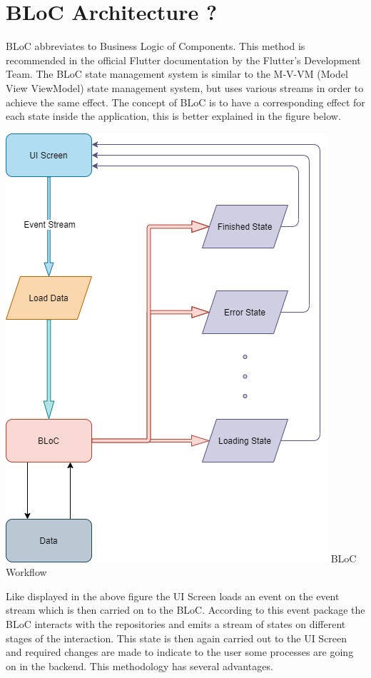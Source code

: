 \documentclass[conference]{IEEEtran}
\newenvironment{Figure}
  {\par\medskip\noindent\minipage{\linewidth}}
  {\endminipage\par\medskip}
\begin{document}
\section{BLoC Architecture ?}
BLoC abbreviates to Business Logic of Components. This method is
recommended in the official Flutter documentation by the Flutter’s
Development Team. The BLoC state management system is similar to
the M-V-VM (Model View ViewModel) state management system, but uses
various streams in order to achieve the same effect. The concept
of BLoC is to have a corresponding effect for each state inside the
application, this is better explained in the figure below.

\begin{Figure}
    \centering
    \includegraphics[width=\linewidth]{Images/BLoC_Example.drawio.png}
    \label{blocFig}
    \figurename{BLoC Workflow}
\end{Figure}

Like displayed in the above figure the UI Screen loads an event on the
event stream which is then carried on to the BLoC. According to this
event package the BLoC interacts with the repositories and emits a
stream of states on different stages of the interaction. This state
is then again carried out to the UI Screen and required changes are
made to indicate to the user some processes are going on in the
backend. This methodology has several advantages.
\end{document}
